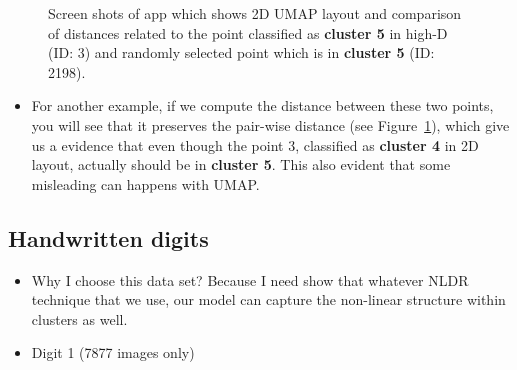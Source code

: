 \documentclass[
  12pt]{article}
\providecommand{\tightlist}{%
  \setlength{\itemsep}{0pt}\setlength{\parskip}{0pt}}\usepackage{longtable,booktabs,array}
\begin{document}
\begin{figure}[H]

\begin{minipage}[t]{\linewidth}

{\centering 


}

\subcaption{\label{fig-pbmc2_sc8}}
\end{minipage}%

\caption{\label{fig-pbmc2_appsc1}Screen shots of app which shows 2D UMAP
layout and comparison of distances related to the point classified as
\textbf{cluster 5} in high-D (ID: 3) and randomly selected point which
is in \textbf{cluster 5} (ID: 2198).}

\end{figure}

\begin{itemize}
\tightlist
\item
  For another example, if we compute the distance between these two
  points, you will see that it preserves the pair-wise distance (see
  Figure~\ref{fig-pbmc2_appsc1}), which give us a evidence that even
  though the point 3, classified as \textbf{cluster 4} in 2D layout,
  actually should be in \textbf{cluster 5}. This also evident that some
  misleading can happens with UMAP.
\end{itemize}

\hypertarget{handwritten-digits}{%
\subsection{Handwritten digits}\label{handwritten-digits}}

\begin{itemize}
\item
  Why I choose this data set? Because I need show that whatever NLDR
  technique that we use, our model can capture the non-linear structure
  within clusters as well.
\item
  Digit 1 (7877 images only)
\end{itemize}
\end{document}
